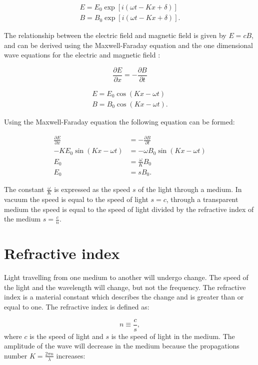 \documentclass[MasterThesisMain.tex]{subfiles}
\begin{document}
\begin{align}
E=E_0\exp[i(\omega t-Kx+\delta)]\\
B=B_0\exp[i(\omega t-Kx+\delta)].
\end{align}

The relationship between the electric field and magnetic field is given by $E=cB$, and can be derived using the Maxwell-Faraday equation and the one dimensional wave equations for the electric and magnetic field \cite{ohanian}:

\begin{equation}
\frac{\partial E}{\partial x} = - \frac{\partial B}{\partial t}
\end{equation}

\begin{align}
E = E_0 \cos{(Kx-\omega t)}\\
B = B_0 \cos{(Kx-\omega t)}.
\end{align}

Using the Maxwell-Faraday equation the following equation can be formed:

\begin{align}
\frac{\partial E}{\partial x} &= - \frac{\partial B}{\partial t}\\
-K E_0 \sin{(Kx-\omega t)} &= -\omega B_0 \sin{(Kx-\omega t)}\\
E_0 &= \frac{\omega}{K} B_0\\
E_0 &= s B_0.
\end{align} 

The constant $\frac{\omega}{K}$ is expressed as the speed $s$ of the light through a medium. In vacuum the speed is equal to the speed of light $s=c$, through a transparent medium the speed is equal to the speed of light divided by the refractive index of the medium $s =\frac{c}{n}$. 

\section{Refractive index} 
Light travelling from one medium to another will undergo change. The speed of the light and the wavelength will change, but not the frequency. The refractive index is a material constant which describes the change and is greater than or equal to one. The refractive index is defined as:

\begin{equation}
n \equiv \frac{c}{s},
\end{equation}
where $c$ is the speed of light and $s$ is the speed of light in the medium. The amplitude of the wave will decrease in the medium because the propagations number $K=\frac{2\pi n}{\lambda}$ increases: 
\end{document}
